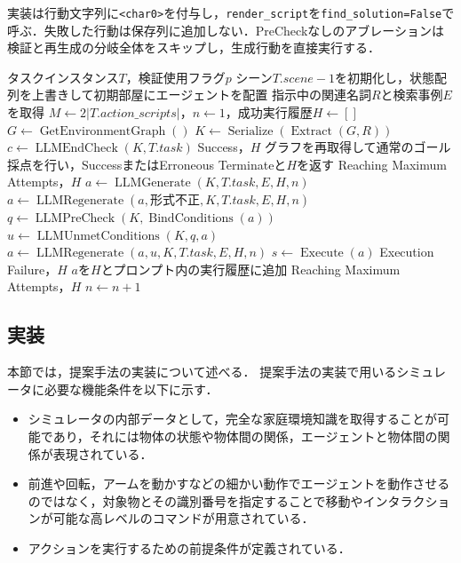 実装は行動文字列に\texttt{<char0>}を付与し，\texttt{render\_script}を\texttt{find\_solution=False}で呼ぶ．失敗した行動は保存列に追加しない．PreCheckなしのアブレーションは検証と再生成の分岐全体をスキップし，生成行動を直接実行する．

\begin{algorithm*}[tb]
\caption{公開実装の1タスクの処理（正常に解析できる入力について）}\label{alg:public_run}
\begin{algorithmic}[1]
\Require タスクインスタンス$T$，検証使用フラグ$p$
\State シーン$T.scene-1$を初期化し，状態配列を上書きして初期部屋にエージェントを配置
\State 指示中の関連名詞$R$と検索事例$E$を取得
\State $M\gets 2|T.action\_scripts|$，$n\gets1$，成功実行履歴$H\gets[]$
  \State $G\gets\operatorname{GetEnvironmentGraph}()$
  \State $K\gets\operatorname{Serialize}(\operatorname{Extract}(G,R))$
  \State $c\gets\operatorname{LLMEndCheck}(K,T.task)$
      \State \Return Success，$H$ 
    \EndIf
    \State グラフを再取得して通常のゴール採点を行い，SuccessまたはErroneous Terminateと$H$を返す
    \State \Return Reaching Maximum Attempts，$H$
  \EndIf
  \State $a\gets\operatorname{LLMGenerate}(K,T.task,E,H,n)$
      \State $a\gets\operatorname{LLMRegenerate}(a,\text{形式不正},K,T.task,E,H,n)$
    \Else
      \State $q\gets\operatorname{LLMPreCheck}(K,\operatorname{BindConditions}(a))$
        \State $u\gets\operatorname{LLMUnmetConditions}(K,q,a)$
        \State $a\gets\operatorname{LLMRegenerate}(a,u,K,T.task,E,H,n)$
      \EndIf
    \EndIf
  \EndIf
  \State $s\gets\operatorname{Execute}(a)$ 
    \State \Return Execution Failure，$H$
  \EndIf
  \State $a$を$H$とプロンプト内の実行履歴に追加
    \State \Return Reaching Maximum Attempts，$H$
  \EndIf
  \State $n\gets n+1$
\EndWhile
\end{algorithmic}
\end{algorithm*}


\subsection{実装} \label{sec4.6}
本節では，提案手法の実装について述べる．
提案手法の実装で用いるシミュレータに必要な機能条件を以下に示す．

\begin{itemize}
    \item シミュレータの内部データとして，完全な家庭環境知識を取得することが可能であり，それには物体の状態や物体間の関係，エージェントと物体間の関係が表現されている．
    \item 前進や回転，アームを動かすなどの細かい動作でエージェントを動作させるのではなく，対象物とその識別番号を指定することで移動やインタラクションが可能な高レベルのコマンドが用意されている．
    \item アクションを実行するための前提条件が定義されている．
\end{itemize}

